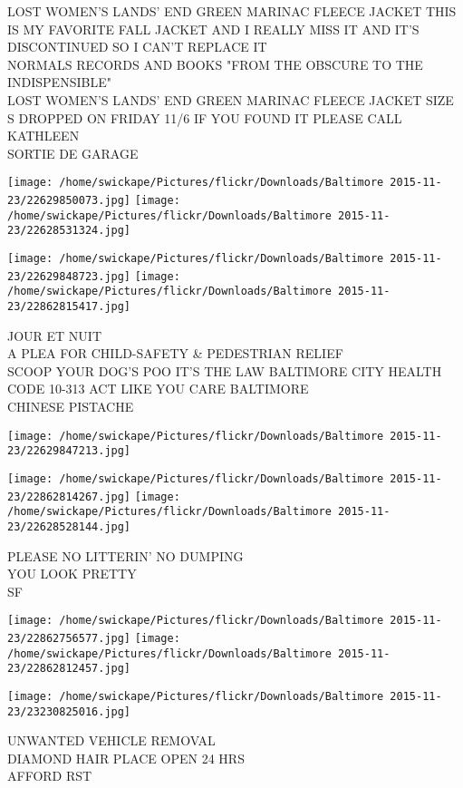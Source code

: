 \documentclass[10pt,letterpaper]{article}
\begin{document}
LOST WOMEN'S LANDS' END GREEN MARINAC FLEECE JACKET THIS IS MY FAVORITE FALL JACKET AND I REALLY MISS IT AND IT'S DISCONTINUED SO I CAN'T REPLACE IT\\
NORMALS RECORDS AND BOOKS "FROM THE OBSCURE TO THE INDISPENSIBLE"\\
LOST WOMEN'S LANDS' END GREEN MARINAC FLEECE JACKET SIZE S DROPPED ON FRIDAY 11/6 IF YOU FOUND IT PLEASE CALL KATHLEEN\\
SORTIE DE GARAGE
\pagebreak

\texttt{[image: /home/swickape/Pictures/flickr/Downloads/Baltimore 2015-11-23/22629850073.jpg]}
\texttt{[image: /home/swickape/Pictures/flickr/Downloads/Baltimore 2015-11-23/22628531324.jpg]}

\texttt{[image: /home/swickape/Pictures/flickr/Downloads/Baltimore 2015-11-23/22629848723.jpg]}
\texttt{[image: /home/swickape/Pictures/flickr/Downloads/Baltimore 2015-11-23/22862815417.jpg]}

JOUR ET NUIT\\
A PLEA FOR CHILD{-}SAFETY \& PEDESTRIAN RELIEF\\
SCOOP YOUR DOG'S POO IT'S THE LAW BALTIMORE CITY HEALTH CODE 10{-}313 ACT LIKE YOU CARE BALTIMORE\\
CHINESE PISTACHE
\pagebreak

\texttt{[image: /home/swickape/Pictures/flickr/Downloads/Baltimore 2015-11-23/22629847213.jpg]}

\vspace{0.25in}
\texttt{[image: /home/swickape/Pictures/flickr/Downloads/Baltimore 2015-11-23/22862814267.jpg]}
\texttt{[image: /home/swickape/Pictures/flickr/Downloads/Baltimore 2015-11-23/22628528144.jpg]}

PLEASE NO LITTERIN' NO DUMPING\\
YOU LOOK PRETTY\\
SF
\pagebreak

\texttt{[image: /home/swickape/Pictures/flickr/Downloads/Baltimore 2015-11-23/22862756577.jpg]}
\texttt{[image: /home/swickape/Pictures/flickr/Downloads/Baltimore 2015-11-23/22862812457.jpg]}

\vspace{0.25in}
\texttt{[image: /home/swickape/Pictures/flickr/Downloads/Baltimore 2015-11-23/23230825016.jpg]}

UNWANTED VEHICLE REMOVAL\\
DIAMOND HAIR PLACE OPEN 24 HRS\\
AFFORD RST
\pagebreak
\end{document}
